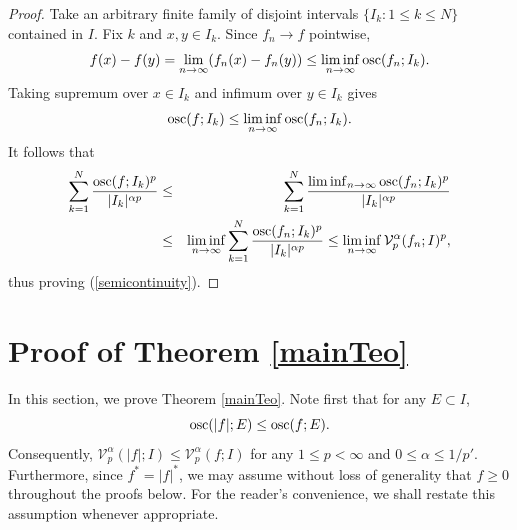 \documentclass{amsart}
\DeclareMathOperator{\osc}{{\rm osc}}
\numberwithin{equation}{section}
\begin{document}
\begin{proof}
    Take an arbitrary finite family of disjoint intervals $\{I_k:1\le k\le N\}$ contained in $I$. 
    Fix $k$ and $x,y\in I_k$. Since $f_n\rightarrow f$ pointwise,
    \begin{equation}
        \nonumber
        f(x)-f(y)=\lim_{n\rightarrow\infty}(f_n(x)-f_n(y))\le\liminf_{n\rightarrow\infty}\osc(f_n;I_k).
    \end{equation}
    Taking supremum over $x\in I_k$ and infimum over $y\in I_k$ gives   
    \begin{equation}
        \nonumber
        \osc(f;I_k)\le\liminf_{n\rightarrow\infty}\osc(f_n;I_k).
    \end{equation}
    It follows that
    \begin{eqnarray}
        \nonumber
        \sum_{k=1}^N\frac{\osc(f;I_k)^p}{|I_k|^{\alpha p}}&\le&\sum_{k=1}^N\frac{\liminf_{n\rightarrow\infty}\osc(f_n;I_k)^p}{|I_k|^{\alpha p}}\\
        \nonumber
        &\le&\liminf_{n\rightarrow\infty}\sum_{k=1}^N\frac{\osc(f_n;I_k)^p}{|I_k|^{\alpha p}}\le\liminf_{n\rightarrow\infty}\mathcal{V}_p^\alpha(f_n;I)^p,
    \end{eqnarray}
    thus proving (\ref{semicontinuity}).
    \end{proof}




\section{Proof of Theorem \ref{mainTeo}}
\label{Proof}
In this section, we prove Theorem \ref{mainTeo}.
Note first that for any $E\subset I$,
\begin{equation}
    \nonumber
    \osc(|f|;E)\le\osc(f;E).
\end{equation}
Consequently, $\mathcal{V}_p^\alpha(|f|;I)\le\mathcal{V}_p^\alpha(f;I)$ for any $1\le p<\infty$ and $0\le\alpha\le 1/p'$.
Furthermore, since $f^*=|f|^*$, we may assume without loss of generality that $f\ge0$ throughout the proofs below. For the reader's convenience, we shall restate this assumption whenever appropriate.
\end{document}
